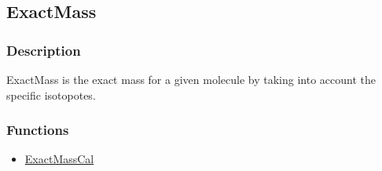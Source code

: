\subsection{ExactMass}\label{ExactMass}
\subsubsection{Description}
ExactMass is the exact mass for a given molecule by taking into account the specific isotopotes.
\subsubsection{Functions}
\begin{itemize}
\item \hyperref[ExactMassCal]{ExactMassCal}
\end{itemize}

